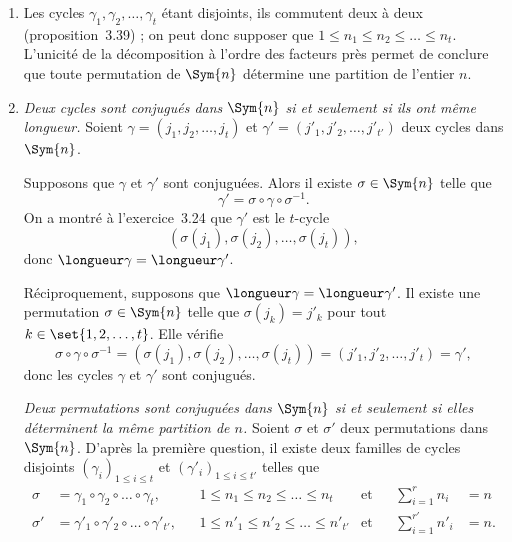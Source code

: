\begin{enumerate}
  \item
    Les cycles $\gamma_1, \gamma_2,\dots, \gamma_t$ étant disjoints, ils commutent deux à deux (proposition~3.39) ; on peut donc supposer que $1 \leq n_1\leq n_2\leq\dots\leq n_t$.
    L'unicité de la décomposition à l'ordre des facteurs près permet de conclure que toute permutation de $\Sym{n}$ détermine une partition de l'entier $n$.

  \item
    \emph{Deux cycles sont conjugués dans $\Sym{n}$ si et seulement si ils ont même longueur.}
    Soient $\gamma = (j_1, j_2, \dots, j_t)$ et $\gamma' = (j'_1, j'_2, \dots, j'_{t'})$ deux cycles dans $\Sym{n}$.

    Supposons que $\gamma$ et $\gamma'$ sont conjuguées.
    Alors il existe $\sigma\in\Sym{n}$ telle que
    \[
      \gamma' = \sigma\circ\gamma\circ\sigma^{-1}.
    \]
    On a montré à l'exercice~3.24 que $\gamma'$ est le $t$-cycle
    \[
      (\sigma(j_1), \sigma(j_2), \dots, \sigma(j_t)),
    \]
    donc $\longueur\gamma = \longueur\gamma'$.

    Réciproquement, supposons que $\longueur\gamma = \longueur\gamma'$.
    Il existe une permutation $\sigma\in\Sym{n}$ telle que $\sigma(j_k) = j'_k$ pour tout $k\in\set{1, 2, \dots, t}$.
    Elle vérifie
    \[
      \sigma\circ\gamma\circ\sigma^{-1} = (\sigma(j_1), \sigma(j_2), \dots, \sigma(j_t)) = (j'_1, j'_2, \dots, j'_t) = \gamma',
    \]
    donc les cycles $\gamma$ et $\gamma'$ sont conjugués.

    \emph{Deux permutations sont conjuguées dans $\Sym{n}$ si et seulement si elles déterminent la même partition de $n$.}
    Soient $\sigma$ et $\sigma'$ deux permutations dans $\Sym{n}$.
    D'après la première question, il existe deux familles de cycles disjoints $(\gamma_i)_{1\leq i\leq t}$ et $(\gamma'_i)_{1\leq i\leq t'}$ telles que
    \begin{align*}
      \sigma &= \gamma_1\circ\gamma_2\circ\dots\circ\gamma_t,
             & & 1\leq n_1 \leq n_2 \leq \dots\leq n_t
             & \text{et} & & \sum_{i=1}^r n_i &= n \\
      \sigma' &= \gamma'_1\circ\gamma'_2\circ\dots\circ\gamma'_{t'},
              & & 1\leq n'_1 \leq n'_2\leq \dots\leq n'_{t'}
              & \text{et} & & \sum_{i=1}^{r'} n'_i &= n.
    \end{align*}


\end{enumerate}
